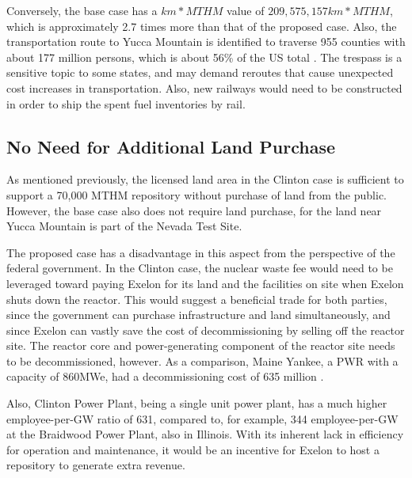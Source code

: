 Conversely, the base case has a $km*MTHM$ value of $209,575,157 km*MTHM$, 
which is approximately 2.7 times more than that of the proposed case. Also, the 
transportation route to Yucca Mountain is identified to traverse 955 counties
with about 177 million persons, which is about 56\% of the US total
 \cite{halstead_yucca_2011}. The trespass is a sensitive topic to some states, and may
 demand reroutes that cause unexpected cost increases in transportation. Also,
 new railways would need to be constructed in order to ship the spent fuel inventories
 by rail. 

\subsection{No Need for Additional Land Purchase}



  
  As mentioned previously, the licensed land area in the Clinton case is 
  sufficient to support a 70,000 MTHM repository without purchase of land from 
  the public.  However, the base case also does not require land purchase, for the land near 
  Yucca Mountain is part of the Nevada Test Site. 
  
  The proposed case has a disadvantage in this aspect from the perspective of 
  the federal government. In the Clinton case, the nuclear waste fee would need 
  to be leveraged toward paying Exelon for its land and the facilities on site 
  when Exelon shuts down the reactor.
  This would suggest a beneficial trade for both parties, since the government
  can purchase infrastructure and land simultaneously, and since Exelon can vastly
  save the cost of decommissioning by selling off the reactor site. The reactor
  core and power-generating component of the reactor site needs to be decommissioned,
  however. As a comparison, Maine Yankee, a PWR with a capacity of 860MWe, had a
  decommissioning cost of 635 million \cite{aker_maine_2004}.


Also, Clinton Power Plant, being a single unit power plant, has a much higher
 employee-per-GW ratio of 631, compared to, for example, 344 employee-per-GW at
the Braidwood Power Plant, also in Illinois. %
With its inherent lack in efficiency for operation and maintenance, it would be
an incentive for Exelon to host a repository to generate extra revenue. 

